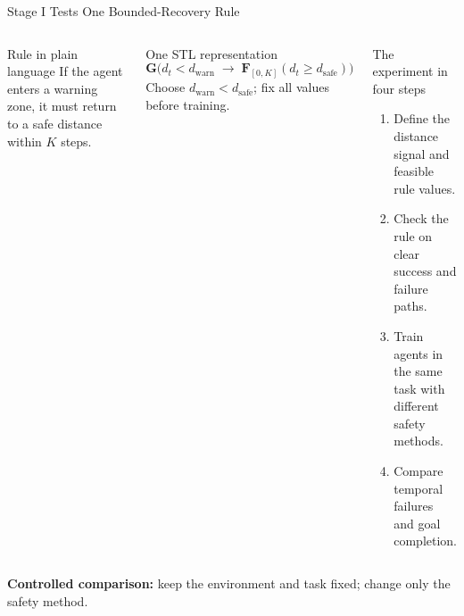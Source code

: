 \documentclass[aspectratio=169]{beamer}
\newcommand{\stlG}{\mathbf{G}}
\newcommand{\stlF}{\mathbf{F}}
\begin{document}
\begin{frame}{Stage I Tests One Bounded-Recovery Rule}
\begin{columns}[T]
\begin{block}{Rule in plain language}
\large
If the agent enters a warning zone, it must return to a safe distance within \(K\) steps.
\end{block}

\begin{block}{One STL representation}
\normalsize
\[
\stlG\bigl(d_t<d_{\mathrm{warn}}\;\rightarrow\;
\stlF_{[0,K]}(d_t\ge d_{\mathrm{safe}})\bigr)
\]
\footnotesize
Choose \(d_{\mathrm{warn}}<d_{\mathrm{safe}}\); fix all values before training.
\end{block}

\begin{block}{The experiment in four steps}
\footnotesize
\begin{enumerate}
  \item Define the distance signal and feasible rule values.
  \item Check the rule on clear success and failure paths.
  \item Train agents in the same task with different safety methods.
  \item Compare temporal failures and goal completion.
\end{enumerate}
\end{block}
\end{columns}

\vspace{0.2em}
\begin{center}
\footnotesize
\textbf{Controlled comparison:} keep the environment and task fixed; change only the safety method.
\end{center}
\end{frame}
\end{document}
